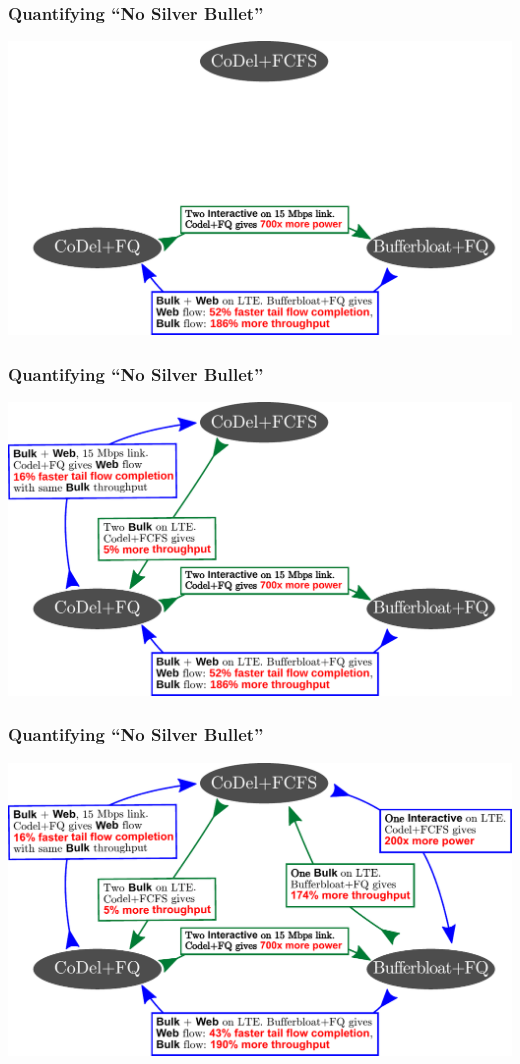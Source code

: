 \begin{frame}[plain]
\frametitle{Quantifying ``No Silver Bullet''}
\begin{center}
\includegraphics[width=\columnwidth]{fig-2.pdf}
\end{center}
\end{frame}

\begin{frame}[plain]
\frametitle{Quantifying ``No Silver Bullet''}
\begin{center}
\includegraphics[width=\columnwidth]{fig-1.pdf}
\end{center}
\end{frame}

\begin{frame}[plain]
\frametitle{Quantifying ``No Silver Bullet''}
\begin{center}
\includegraphics[width=\columnwidth]{fig.pdf}
\end{center}
\end{frame}

